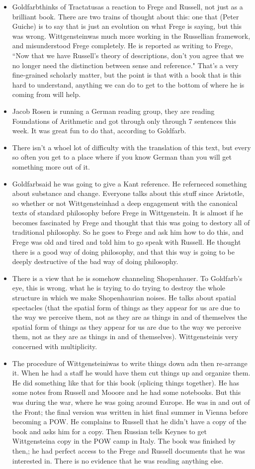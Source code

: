 \documentclass[12pt]{article}
\theoremstyle{definition}
\newcommand{\w}{Wittgenstein}
\newcommand{\T}{Tractatus}
\newcommand{\g}{Goldfarb}
\begin{document}
\begin{itemize}
    \item \g thinks of \T as a reaction to Frege and Russell, not just as a brilliant book. There are two trains of thought about this: one that (Peter Guiche) is to say that is just an evolution on what Frege is saying, but this was wrong. \w was much more working in the Russellian framework, and misunderstood Frege completely. He is reported as writing to Frege, ``Now that we have Russell's theory of descriptions, don't you agree that we no longer need the distinction between sense and reference." That's a very fine-grained scholarly matter, but the point is that with a book that is this hard to understand, anything we can do to get to the bottom of where he is coming from will help.
    \item Jacob Rosen is running a German reading group, they are reading Foundations of Arithmetic and got through only through 7 sentences this week. It was great fun to do that, according to \g.
    \item There isn't a whoel lot of difficulty with the translation of this text, but every so often you get to a place where if you know German than you will get something more out of it.
    \item \g said he was going to give a Kant reference. He referneced something about substance and change. Everyone talks about this stuff since Aristotle, so whether or not \w had a deep engagement with the canonical texts of standard philosophy before Frege in \w. It is almost if he becomes fascinated by Frege and thought that this was going to destory all of traditional philosophy. So he goes to Frege and ask him how to do this, and Frege was old and tired and told him to go speak with Russell. He thought there is a good way of doing philosophy, and that this way is going to be deeply destructive of the bad way of doing philosophy.
    \item There is a view that he is somehow channeling Shopenhauer. To Goldfarb's eye, this is wrong. what he is trying to do trying to destroy the whole structure in which we make Shopenhaurian noises. He talks about spatial spectacles (that the spatial form of things as they appear for us are due to the way we perceive them, not as they are as things in and of themselves the spatial form of things as they appear for us are due to the way we perceive them, not as they are as things in and of themselves). \w is very concerned with multiplicity. 
    \item The procedure of \w iwas to write things down adn then re-arrange it. When he had a staff he would have them cut things up and organize them. He did something like that for this book (splicing things together). He has some notes from Russell and Mooore and he had some notebooks. But this was during the war, where he was going around Europe. He was in and out of the Front; the final version was written in hist final summer in Vienna before becoming a POW. He complains to Russell that he didn't have a copy of the book and asks him for a copy. Then Russian tells Keynes to get \w a copy in the POW camp in Italy. The book was finished by then,; he had perfect access to the Frege and Russell documents that he was interested in. There is no evidence that he was reading anything else.

\end{itemize}
\end{document}
